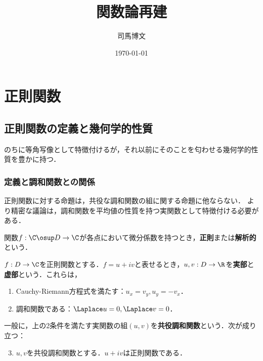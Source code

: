\documentclass[uplatex, dvipdfmx]{jsreport}
\title{関数論再建}
\author{司馬博文}
\date{\today}
\begin{document}
\tableofcontents

\chapter{正則関数}

\section{正則関数の定義と幾何学的性質}

\begin{tcolorbox}[colframe=ForestGreen, colback=ForestGreen!10!white,breakable,colbacktitle=ForestGreen!40!white,coltitle=black,fonttitle=\bfseries\sffamily,
title=]
    のちに等角写像として特徴付けるが，それ以前にそのことを匂わせる幾何学的性質を豊かに持つ．
\end{tcolorbox}

\subsection{定義と調和関数との関係}

\begin{tcolorbox}[colframe=ForestGreen, colback=ForestGreen!10!white,breakable,colbacktitle=ForestGreen!40!white,coltitle=black,fonttitle=\bfseries\sffamily,
title=]
    正則関数に対する命題は，共役な調和関数の組に関する命題に他ならない．
    より精密な議論は，調和関数を平均値の性質を持つ実関数として特徴付ける必要がある．
\end{tcolorbox}

\begin{definition}
    関数$f:\C\osup D\to\C$が各点において微分係数を持つとき，\textbf{正則}または\textbf{解析的}という．
\end{definition}

\begin{lemma}
    $f:D\to\C$を正則関数とする．$f=u+iv$と表せるとき，$u,v:D\to\R$を\textbf{実部}と\textbf{虚部}という．これらは，
    \begin{enumerate}
        \item Cauchy-Riemann方程式を満たす：$u_x=v_y,u_y=-v_x$．
        \item 調和関数である：$\Laplace u=0,\Laplace v=0$．
    \end{enumerate}
    一般に，上の2条件を満たす実関数の組$(u,v)$を\textbf{共役調和関数}という．次が成り立つ：
    \begin{enumerate}\setcounter{enumi}{2}
        \item $u,v$を共役調和関数とする．$u+iv$は正則関数である．
    \end{enumerate}
\end{lemma}
\end{document}

